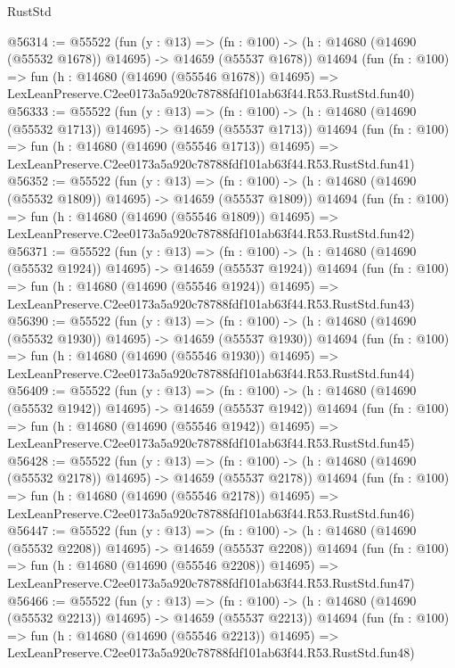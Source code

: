 \begin{lexlean}{RustStd}
\begin{coremodule}
@56314 := @55522
    (fun (y : @13) =>
    (fn : @100) -> (h : @14680 (@14690 (@55532 @1678)) @14695) -> @14659 (@55537 @1678))
    @14694
    (fun (fn : @100) =>
    fun (h : @14680 (@14690 (@55546 @1678)) @14695) =>
    LexLeanPreserve.C2ee0173a5a920c78788fdf101ab63f44.R53.RustStd.fun40)
@56333 := @55522
    (fun (y : @13) =>
    (fn : @100) -> (h : @14680 (@14690 (@55532 @1713)) @14695) -> @14659 (@55537 @1713))
    @14694
    (fun (fn : @100) =>
    fun (h : @14680 (@14690 (@55546 @1713)) @14695) =>
    LexLeanPreserve.C2ee0173a5a920c78788fdf101ab63f44.R53.RustStd.fun41)
@56352 := @55522
    (fun (y : @13) =>
    (fn : @100) -> (h : @14680 (@14690 (@55532 @1809)) @14695) -> @14659 (@55537 @1809))
    @14694
    (fun (fn : @100) =>
    fun (h : @14680 (@14690 (@55546 @1809)) @14695) =>
    LexLeanPreserve.C2ee0173a5a920c78788fdf101ab63f44.R53.RustStd.fun42)
@56371 := @55522
    (fun (y : @13) =>
    (fn : @100) -> (h : @14680 (@14690 (@55532 @1924)) @14695) -> @14659 (@55537 @1924))
    @14694
    (fun (fn : @100) =>
    fun (h : @14680 (@14690 (@55546 @1924)) @14695) =>
    LexLeanPreserve.C2ee0173a5a920c78788fdf101ab63f44.R53.RustStd.fun43)
@56390 := @55522
    (fun (y : @13) =>
    (fn : @100) -> (h : @14680 (@14690 (@55532 @1930)) @14695) -> @14659 (@55537 @1930))
    @14694
    (fun (fn : @100) =>
    fun (h : @14680 (@14690 (@55546 @1930)) @14695) =>
    LexLeanPreserve.C2ee0173a5a920c78788fdf101ab63f44.R53.RustStd.fun44)
@56409 := @55522
    (fun (y : @13) =>
    (fn : @100) -> (h : @14680 (@14690 (@55532 @1942)) @14695) -> @14659 (@55537 @1942))
    @14694
    (fun (fn : @100) =>
    fun (h : @14680 (@14690 (@55546 @1942)) @14695) =>
    LexLeanPreserve.C2ee0173a5a920c78788fdf101ab63f44.R53.RustStd.fun45)
@56428 := @55522
    (fun (y : @13) =>
    (fn : @100) -> (h : @14680 (@14690 (@55532 @2178)) @14695) -> @14659 (@55537 @2178))
    @14694
    (fun (fn : @100) =>
    fun (h : @14680 (@14690 (@55546 @2178)) @14695) =>
    LexLeanPreserve.C2ee0173a5a920c78788fdf101ab63f44.R53.RustStd.fun46)
@56447 := @55522
    (fun (y : @13) =>
    (fn : @100) -> (h : @14680 (@14690 (@55532 @2208)) @14695) -> @14659 (@55537 @2208))
    @14694
    (fun (fn : @100) =>
    fun (h : @14680 (@14690 (@55546 @2208)) @14695) =>
    LexLeanPreserve.C2ee0173a5a920c78788fdf101ab63f44.R53.RustStd.fun47)
@56466 := @55522
    (fun (y : @13) =>
    (fn : @100) -> (h : @14680 (@14690 (@55532 @2213)) @14695) -> @14659 (@55537 @2213))
    @14694
    (fun (fn : @100) =>
    fun (h : @14680 (@14690 (@55546 @2213)) @14695) =>
    LexLeanPreserve.C2ee0173a5a920c78788fdf101ab63f44.R53.RustStd.fun48)

\end{coremodule}
\end{lexlean}
